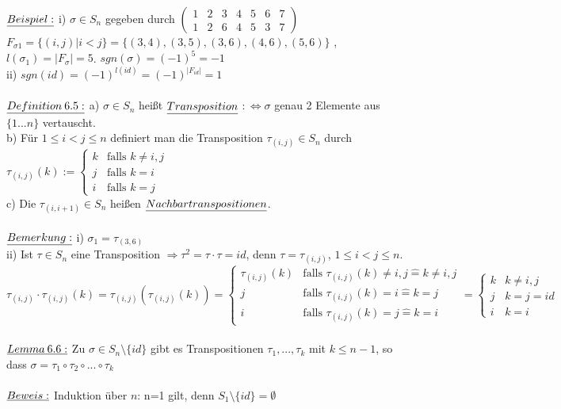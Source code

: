 \documentclass[fleqn, a4paper, 11pt]{scrartcl}
\theoremstyle{definition}
\begin{document}
$\uline{Beispiel:}$ i) $\sigma\in S_n$ gegeben durch $\begin{pmatrix}
	1 & 2 & 3 & 4 & 5 & 6 & 7\\
	1 & 2 & 6 & 4 & 5 & 3 & 7
\end{pmatrix}$ $F_{\sigma 1}=\{(i,j)|i<j\}=\{(3,4),(3,5),(3,6),(4,6),(5,6)\}$ , $l(\sigma_1)=|F_\sigma |=5$. $sgn(\sigma)=(-1)^5=-1$\\
ii) $sgn(id)=(-1)^{l(id)}=(-1)^{|F_{id}|}=1$\\
\\
$\uline{Definition\:6.5:}$ a) $\sigma\in S_n$ heißt $\uline{Transposition}$ $:\Leftrightarrow \sigma$ genau 2 Elemente aus $\{1...n\}$ vertauscht.\\
b) Für $1\leq i<j\leq n$ definiert man die Transposition $\tau_{(i,j)}\in S_n$ durch $\tau_{(i,j)}(k):=\begin{cases}
	k & \text{falls }k\neq i,j\\
	j & \text{falls }k=i\\
	i & \text{falls }k=j
\end{cases}$\\
c) Die $\tau_{(i,i+1)}\in S_n$ heißen $\uline{Nachbartranspositionen}$.\\
\\
$\uline{Bemerkung:}$ i) $\sigma_1=\tau_{(3,6)}$\\
ii) Ist $\tau\in S_n$ eine Transposition $\Rightarrow \tau^2=\tau\cdot\tau=id$, denn $\tau=\tau_{(i,j)}$, $1\leq i<j\leq n$. \\
$\tau_{(i,j)}\cdot\tau_{(i,j)}(k)=\tau_{(i,j)}(\tau_{(i,j)}(k))=\begin{cases}
	\tau_{(i,j)}(k) & \text{falls }\tau_{(i,j)}(k)\neq i,j\widehat{=} k\neq i,j\\
	j & \text{falls } \tau_{(i,j)}(k)=i\widehat{=} k=j\\
	i & \text{falls } \tau_{(i,j)}(k)=j\widehat{=}k=i
\end{cases}=\begin{cases}
	k & k\neq i,j\\
	j & k=j=id\\
	i & k=i
\end{cases}$\\
\\
$\uline{Lemma\:6.6:}$ Zu $\sigma\in S_n\setminus\{id\}$ gibt es Transpositionen $\tau_1,...,\tau_k$ mit $k\leq n-1$, so dass $\sigma=\tau_1\circ\tau_2\circ ...\circ\tau_k$\\
\\
$\uline{Beweis:}$ Induktion über $n$: n=1 gilt, denn $S_1\setminus\{id\}=\emptyset$\\
\end{document}
